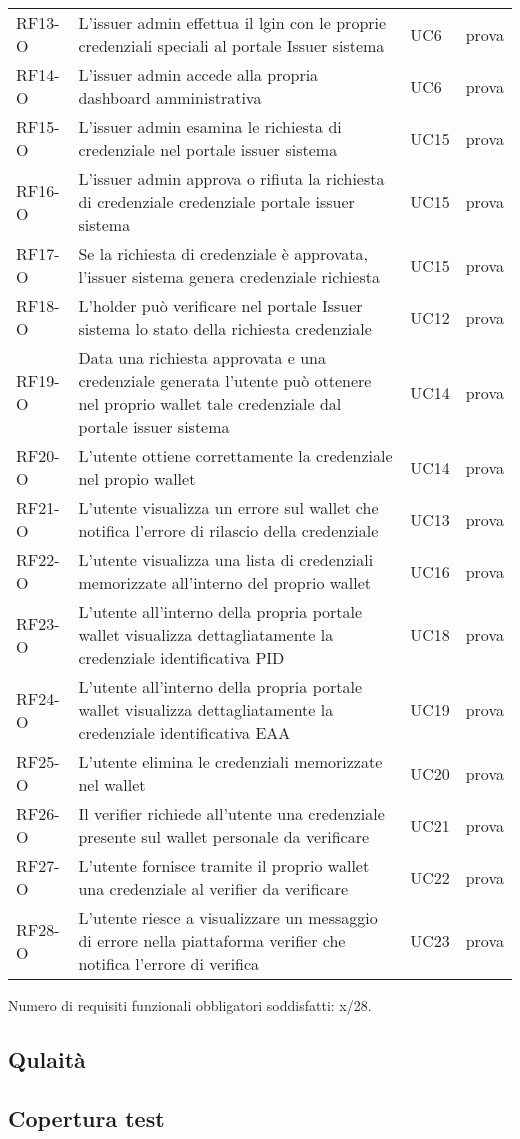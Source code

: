 \begin{longtable}{|p{}|p{}|p{}|p{}|}
        RF13-O & L'issuer admin effettua il lgin con le proprie credenziali speciali al portale Issuer sistema & UC6& prova\\ 
        RF14-O & L'issuer admin accede alla propria dashboard amministrativa & UC6& prova\\
        RF15-O & L'issuer admin esamina le richiesta di credenziale nel portale issuer sistema  & UC15& prova\\
        RF16-O & L'issuer admin approva o rifiuta la richiesta di credenziale credenziale portale issuer sistema & UC15& prova\\
        RF17-O & Se la richiesta di credenziale  è approvata, l'issuer sistema genera credenziale richiesta & UC15& prova\\
        RF18-O & L'holder può verificare nel portale Issuer sistema lo stato della richiesta credenziale & UC12& prova\\ 
        RF19-O & Data una richiesta approvata e una credenziale generata l'utente può ottenere nel proprio wallet tale credenziale dal portale issuer sistema & UC14 & prova\\
        RF20-O & L'utente ottiene correttamente la credenziale nel propio wallet & UC14& prova\\
        RF21-O & L'utente visualizza un errore sul wallet che notifica l'errore di rilascio della credenziale & UC13& prova\\
        RF22-O & L'utente visualizza una lista di credenziali memorizzate all'interno del proprio wallet& UC16& prova\\
        RF23-O & L'utente all'interno della propria portale wallet visualizza dettagliatamente la credenziale identificativa PID & UC18& prova\\
        RF24-O & L'utente all'interno della propria portale wallet visualizza dettagliatamente la credenziale identificativa EAA & UC19& prova\\
        RF25-O & L'utente elimina le credenziali memorizzate nel wallet & UC20& prova\\
        RF26-O & Il verifier richiede all'utente una credenziale presente sul wallet personale da verificare & UC21& prova\\
        RF27-O & L'utente fornisce tramite il proprio wallet una credenziale al verifier da verificare & UC22& prova\\
        RF28-O & L'utente riesce a visualizzare un messaggio di errore nella piattaforma verifier che notifica l'errore di verifica & UC23& prova\\
        \hline
    \end{longtable}

Numero di requisiti funzionali obbligatori soddisfatti: x/28.    


\subsection{Qulaità}

\subsection{Copertura test}